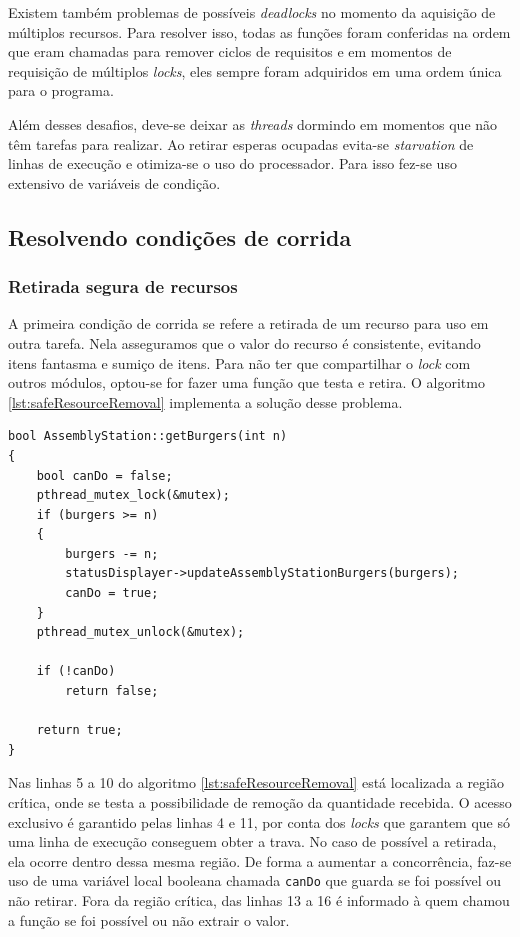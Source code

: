 \documentclass[a4paper]{article}
\begin{document}
Existem também problemas de possíveis \textit{deadlocks} no momento da aquisição de múltiplos recursos. Para resolver isso, todas as funções foram conferidas na ordem que eram chamadas para remover ciclos de requisitos e em momentos de requisição de múltiplos \textit{locks}, eles sempre foram adquiridos em uma ordem única para o programa.

Além desses desafios, deve-se deixar as \textit{threads} dormindo em momentos que não têm tarefas para realizar. Ao retirar esperas ocupadas evita-se \textit{starvation} de linhas de execução e otimiza-se o uso do processador. Para isso fez-se uso extensivo de variáveis de condição.

\subsection{Resolvendo condições de corrida}

\subsubsection{Retirada segura de recursos}
\label{sec:safeResourceRemoval}

A primeira condição de corrida se refere a retirada de um recurso para uso em outra tarefa. Nela asseguramos que o valor do recurso é consistente, evitando itens fantasma e sumiço de itens. Para não ter que compartilhar o \textit{lock} com outros módulos, optou-se for fazer uma função que testa e retira. O algoritmo \ref{lst:safeResourceRemoval} implementa a solução desse problema.

\begin{lstlisting}[caption=Retirada segura de recursos da estação de montagem de hambúrgueres.\label{lst:safeResourceRemoval}]
bool AssemblyStation::getBurgers(int n)
{
	bool canDo = false;
	pthread_mutex_lock(&mutex);
	if (burgers >= n)
	{
		burgers -= n;
		statusDisplayer->updateAssemblyStationBurgers(burgers);
		canDo = true;
	}
	pthread_mutex_unlock(&mutex);
	
	if (!canDo)
		return false;
	
	return true;
}
\end{lstlisting}

Nas linhas 5 a 10 do algoritmo \ref{lst:safeResourceRemoval} está localizada a região crítica, onde se testa a possibilidade de remoção da quantidade recebida. O acesso exclusivo é garantido pelas linhas 4 e 11, por conta dos \textit{locks} que garantem que só uma linha de execução conseguem obter a trava. No caso de possível a retirada, ela ocorre dentro dessa mesma região. De forma a aumentar a concorrência, faz-se uso de uma variável local booleana chamada \texttt{canDo} que guarda se foi possível ou não retirar. Fora da região crítica, das linhas 13 a 16 é informado à quem chamou a função se foi possível ou não extrair o valor.
\end{document}
